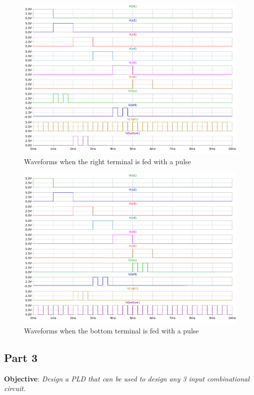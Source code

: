 \documentclass[a4paper,11pt]{article}%
\begin{document}
\begin{figure}[H]
	\centering
	\includegraphics[scale=0.5]{figures/2part2/right.pdf}
	\caption{Waveforms when the right terminal is fed with a pulse}
\end{figure}

\begin{figure}[H]
	\centering
	\includegraphics[scale=0.5]{figures/2part2/bottom.pdf}
	\caption{Waveforms when the bottom terminal is fed with a pulse}
\end{figure}


\pagebreak
\subsection{Part 3}
\textbf{Objective}: \textit{Design a PLD that can be used to design any 3 input
combinational circuit.}\\
\end{document}
